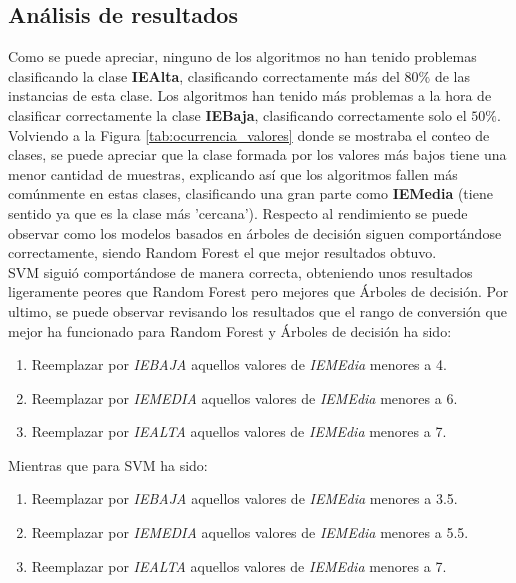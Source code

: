 \subsection{Análisis de resultados}
Como se puede apreciar, ninguno de los algoritmos no han tenido problemas clasificando la clase \textbf{IEAlta}, clasificando correctamente más del $80\%$ de las instancias de esta clase.
Los algoritmos han tenido más problemas a la hora de clasificar correctamente la clase \textbf{IEBaja}, clasificando correctamente solo el $50\%$. Volviendo a la Figura \ref{tab:ocurrencia_valores} donde se mostraba el conteo de clases, se puede apreciar que la clase formada por los valores más bajos tiene una menor cantidad de muestras, explicando así que los algoritmos fallen más comúnmente en estas clases, clasificando una gran parte como \textbf{IEMedia} (tiene sentido ya que es la clase más 'cercana').
\linebreak
Respecto al rendimiento se puede observar como los modelos basados en árboles de decisión siguen comportándose correctamente, siendo Random Forest el que mejor resultados obtuvo. \\
SVM siguió comportándose de manera correcta, obteniendo unos resultados ligeramente peores que Random Forest pero mejores que Árboles de decisión.
\linebreak
Por ultimo, se puede observar revisando los resultados que el rango de conversión que mejor ha funcionado para Random Forest y Árboles de decisión ha sido:
\begin{enumerate}
	\item Reemplazar por \textit{IEBAJA} aquellos valores de \textit{IEMEdia} menores a 4.
	\item Reemplazar por \textit{IEMEDIA} aquellos valores de \textit{IEMEdia} menores a 6.
	\item Reemplazar por \textit{IEALTA} aquellos valores de \textit{IEMEdia} menores a 7.
\end{enumerate}
Mientras que para SVM ha sido:
\begin{enumerate}
	\item Reemplazar por \textit{IEBAJA} aquellos valores de \textit{IEMEdia} menores a 3.5.
	\item Reemplazar por \textit{IEMEDIA} aquellos valores de \textit{IEMEdia} menores a 5.5.
	\item Reemplazar por \textit{IEALTA} aquellos valores de \textit{IEMEdia} menores a 7.
\end{enumerate}


